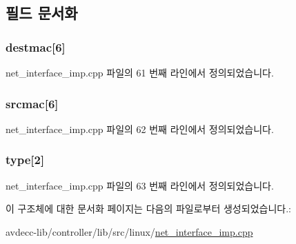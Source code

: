 \subsection{필드 문서화}
\subsubsection[{\texorpdfstring{destmac}{destmac}}]{ destmac\mbox{[}6\mbox{]}}\hypertarget{structavdecc__lib_1_1ether_i_i_a322633c436b95460687a78c149a9e274}{}\label{structavdecc__lib_1_1ether_i_i_a322633c436b95460687a78c149a9e274}


net\+\_\+interface\+\_\+imp.\+cpp 파일의 61 번째 라인에서 정의되었습니다.

\subsubsection[{\texorpdfstring{srcmac}{srcmac}}]{ srcmac\mbox{[}6\mbox{]}}\hypertarget{structavdecc__lib_1_1ether_i_i_a843681c2d2a3810fc505cd7ca30f7406}{}\label{structavdecc__lib_1_1ether_i_i_a843681c2d2a3810fc505cd7ca30f7406}


net\+\_\+interface\+\_\+imp.\+cpp 파일의 62 번째 라인에서 정의되었습니다.

\subsubsection[{\texorpdfstring{type}{type}}]{ type\mbox{[}2\mbox{]}}\hypertarget{structavdecc__lib_1_1ether_i_i_ac74431c92cab314e7bcb4518458932a5}{}\label{structavdecc__lib_1_1ether_i_i_ac74431c92cab314e7bcb4518458932a5}


net\+\_\+interface\+\_\+imp.\+cpp 파일의 63 번째 라인에서 정의되었습니다.



이 구조체에 대한 문서화 페이지는 다음의 파일로부터 생성되었습니다.\+:\begin{DoxyCompactItemize}
\item 
avdecc-\/lib/controller/lib/src/linux/\hyperlink{linux_2net__interface__imp_8cpp}{net\+\_\+interface\+\_\+imp.\+cpp}\end{DoxyCompactItemize}
